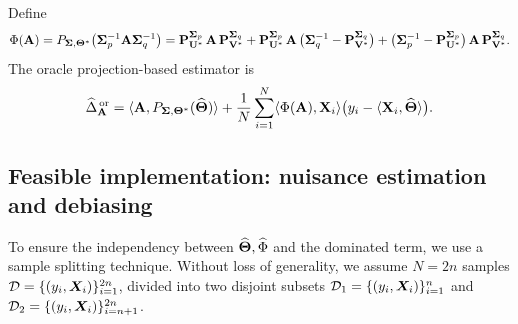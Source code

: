 \documentclass[authoryear,preprint,review,12pt]{elsarticle}
\begin{document}
	Define 
	\begin{equation}
		\Phi(\mathbf A)
		=
		P_{\mathbf{ \Sigma},\mathbf{\Theta}^\ast}
		\bigl(\mathbf \Sigma_p^{-1}\mathbf A \mathbf \Sigma_q^{-1}\bigr)
		=
		\mathbf P_{\mathbf U^\ast}^{\mathbf \Sigma_p}
		\,\mathbf A\,
		\mathbf P_{\mathbf V^\ast}^{\mathbf \Sigma_q} 
		+
		\mathbf P_{\mathbf U^\ast}^{\mathbf \Sigma_p}
		\,\mathbf A\,
		\bigl(\mathbf \Sigma_q^{-1} - \mathbf P_{\mathbf V^\ast}^{\mathbf \Sigma_q}\bigr) 
		+
		\bigl(\mathbf \Sigma_p^{-1} - \mathbf P_{\mathbf U^\ast}^{\mathbf \Sigma_p}\bigr)
		\,\mathbf A\,
		\mathbf P_{\mathbf V^\ast}^{\mathbf \Sigma_q}.
		\label{eq:phi_mat}
	\end{equation}
	The oracle projection-based estimator is
	\begin{equation}
		\widehat\Delta_{\mathbf{A}}^{\,\mathrm{or}}
		=
		\langle \mathbf{A}, P_{\mathbf{ \Sigma},\mathbf{\Theta}^\ast}(\widehat{\mathbf{\Theta}})\rangle
		+
		\frac{1}{N}\sum_{i=1}^N
		\langle \Phi(\mathbf{A}),\mathbf X_i\rangle
		\bigl(y_i-\langle \mathbf X_i,\widehat{\mathbf{\Theta}}\rangle\bigr).
		\label{eq:oracle-matrix}
	\end{equation}
	
	
	
	\subsection{Feasible implementation: nuisance estimation and debiasing}
	\label{sec:mat_nuisance}
	To ensure the independency between $\widehat{\mathbf{\Theta}}, \widehat\Phi$ and the dominated term, we use a sample splitting technique. 
	Without loss of generality,  we assume $N=2n$ samples $\mathcal{D} = \{(y_i, \boldsymbol X_i)\}_{i=1}^{2n}$, divided into two disjoint subsets  $\mathcal{D}_1 = \{(y_i, \boldsymbol X_i)\}_{i=1}^{n}$ and $\mathcal{D}_2 = \{(y_i, \boldsymbol X_i)\}_{i=n+1}^{2n}$. 
	
\end{document}
